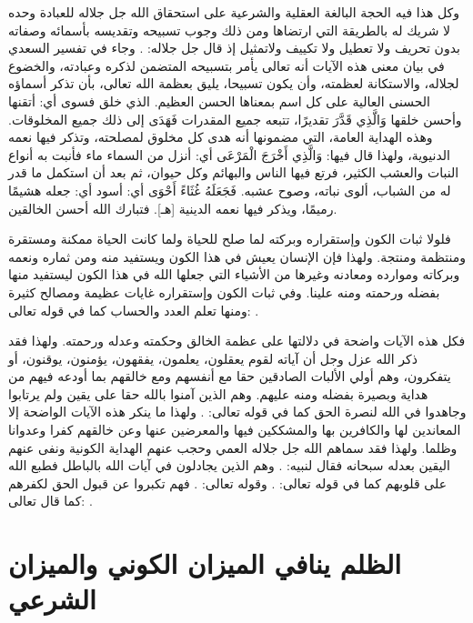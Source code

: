 وكل هذا فيه الحجة البالغة العقلية والشرعية على استحقاق الله جل جلاله للعبادة وحده لا شريك له بالطريقة التي ارتضاها ومن ذلك وجوب تسبيحه وتقديسه بأسمائه وصفاته بدون تحريف ولا تعطيل ولا تكييف ولاتمثيل إذ قال جل جلاله: 
\quranayah*[87][1-5]{\footnotesize \surahname*[87]}.
وجاء في تفسير السعدي في بيان معنى هذه الآيات أنه تعالى يأمر بتسبيحه المتضمن لذكره وعبادته، والخضوع لجلاله، والاستكانة لعظمته، وأن يكون تسبيحا، يليق بعظمة الله تعالى، بأن تذكر أسماؤه الحسنى العالية على كل اسم بمعناها الحسن العظيم. {الذي خلق فسوى} أي: أتقنها وأحسن خلقها { وَالَّذِي قَدَّرَ } تقديرًا، تتبعه جميع المقدرات { فَهَدَى } إلى ذلك جميع المخلوقات. وهذه الهداية العامة، التي مضمونها أنه هدى كل مخلوق لمصلحته، وتذكر فيها نعمه الدنيوية، ولهذا قال فيها: { وَالَّذِي أَخْرَجَ الْمَرْعَى } أي: أنزل من السماء ماء فأنبت به أنواع النبات والعشب الكثير، فرتع فيها الناس والبهائم وكل حيوان، ثم بعد أن استكمل ما قدر له من الشباب، ألوى نباته، وصوح عشبه. { فَجَعَلَهُ غُثَاءً أَحْوَى } أي: أسود أي: جعله هشيمًا رميمًا، ويذكر فيها نعمه الدينية [هـ]. فتبارك الله أحسن الخالقين.

فلولا ثبات الكون وإستقراره وبركته لما صلح للحياة ولما كانت الحياة ممكنة ومستقرة ومنتظمة ومنتجة. ولهذا فإن الإنسان يعيش في هذا الكون ويستفيد منه ومن ثماره ونعمه وبركاته وموارده ومعادنه وغيرها من الأشياء التي جعلها الله في هذا الكون ليستفيد منها بفضله ورحمته ومنه علينا.
وفي ثبات الكون وإستقراره غايات عظيمة ومصالح كثيرة ومنها تعلم العدد والحساب كما في قوله تعالى: 
\quranayah*[10][5]{\footnotesize \surahname*[10]}. 

فكل هذه الآيات واضحة في دلالتها على عظمة الخالق وحكمته وعدله ورحمته. ولهذا فقد ذكر الله عزل وجل أن آياته لقوم يعقلون، يعلمون، يفقهون، يؤمنون، يوقنون، أو يتفكرون، وهم أولي الألبات الصادقين حقا مع أنفسهم ومع خالقهم بما أودعه فيهم من هداية وبصيرة بفضله ومنه عليهم. وهم الذين آمنوا بالله حقا على يقين ولم يرتابوا وجاهدوا في الله لنصرة الحق كما في قوله تعالى: 
\quranayah*[49][15]{\footnotesize \surahname*[49]}.
ولهذا ما ينكر هذه الآيات الواضحة إلا المعاندين لها والكافرين بها والمشككين فيها والمعرضين عنها وعن خالقهم كفرا وعدوانا وظلما. ولهذا فقد سماهم الله جل جلاله العمي وحجب عنهم الهداية الكونية ونفى عنهم اليقين بعدله سبحانه فقال لنبيه: 
\quranayah*[27][81-82]{\footnotesize \surahname*[27]}. وهم الذين يجادلون في آيات الله بالباطل فطبع الله على قلوبهم كما في قوله تعالى:
\quranayah*[40][35]{\footnotesize \surahname*[40]}.
وقوله تعالى: 
\quranayah*[40][56]{\footnotesize \surahname*[40]}.
فهم تكبروا عن قبول الحق لكفرهم كما قال تعالى: 
\quranayah*[40][4]{\footnotesize \surahname*[40]}.


\section{الظلم ينافي الميزان الكوني والميزان الشرعي}

